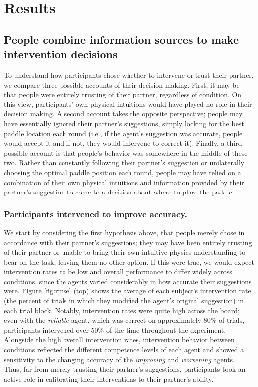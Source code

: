 \documentclass[10pt,letterpaper]{article}
\begin{document}
\section{Results}

\subsection{People combine information sources to make intervention decisions}

To understand how participants chose whether to intervene or trust their partner, we compare three possible accounts of their decision making. First, it may be that people were entirely trusting of their partner, regardless of condition. On this view, participants' own physical intuitions would have played no role in their decision making. A second account takes the opposite perspective; people may have essentially ignored their partner's suggestions, simply looking for the best paddle location each round (i.e., if the agent's suggestion was accurate, people would accept it and if not, they would intervene to correct it). Finally, a third possible account is that people's behavior was somewhere in the middle of these two. Rather than constantly following their partner's suggestion or unilaterally choosing the optimal paddle position each round, people may have relied on a combination of their own physical intuitions and information provided by their partner's suggestion to come to a decision about where to place the paddle. 

\subsubsection{Participants intervened to improve accuracy.} We start by considering the first hypothesis above, that people merely chose in accordance with their partner's suggestions; they may have been entirely trusting of their partner or unable to bring their own intuitive physics understanding to bear on the task, leaving them no other option. If this were true, we would expect intervention rates to be low and overall performance to differ widely across conditions, since the agents varied considerably in how accurate their suggestions were. Figure \ref{fig:rmse} (top) shows the average of each subject's intervention rate (the percent of trials in which they modified the agent's original suggestion) in each trial block. Notably, intervention rates were quite high across the board; even with the \textit{reliable} agent, which was correct on approximately 80\% of trials, participants intervened over 50\% of the time throughout the experiment. Alongside the high overall intervention rates, intervention behavior between conditions reflected the different competence levels of each agent and showed a sensitivity to the changing accuracy of the \textit{improving} and \textit{worsening} agents. Thus, far from merely trusting their partner's suggestions, participants took an active role in calibrating their interventions to their partner's ability.
\end{document}
